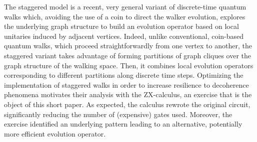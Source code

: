 %
%
%


The staggered model is a recent, very general variant of discrete-time quantum walks which, avoiding the use of a coin to direct the walker evolution, explores the underlying graph structure to build an evolution operator based on local unitaries induced by adjacent vertices. Indeed, unlike conventional, coin-based quantum walks, which proceed straightforwardly from one vertex to another, the staggered variant takes advantage of forming partitions of graph cliques over the graph structure of the walking space. Then, it combines  local evolution operators  corresponding to different partitions  along discrete time steps.  Optimizing  the implementation of staggered walks in order to increase resilience to decoherence phenomena motivates their analysis with the ZX-calculus, an exercise that is the object of this short paper. As expected, the calculus rewrote the original circuit, significantly reducing the number of (expensive) gates used. Moreover, the exercise identified an underlying pattern leading to an alternative, potentially more efficient evolution operator.



%
%
%
%
%
%
%
%
